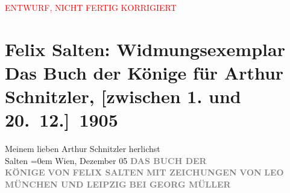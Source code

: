 
\begin{center}
            \textcolor{red}{ENTWURF, NICHT FERTIG KORRIGIERT}
                      \end{center}
            
         
         \renewcommand{\erwaehntePersonen}{Personen: Leo Kober}
         \renewcommand{\erwaehnteInstitutionen}{Institutionen: Georg Müller Verlag}
         \renewcommand{\erwaehnteOrte}{Orte: Leipzig, München, Wien}
         \renewcommand{\erwaehnteWerke}{Werke: Das Buch der Könige}
               \section[Felix Salten: Widmungsexemplar Das Buch der Könige für Arthur Schnitzler, {[}zwischen 1. und 20. 12.{]} 1905]{ Felix Salten: Widmungsexemplar Das Buch der Könige für Arthur
               Schnitzler, {[}zwischen 1. und 20. 12.{]} 1905}\nopagebreak{}\rehead{ }\begin{ledgroupsized}[t]{13cm}\normalsize\beginnumbering \toendnotes[C]{\smallbreak\pagebreak[2]} 
\pstart
           \noindent{}\centering{}{\pb}Meinem lieben Arthur Schnitzler\pend
           \pstart
           herlichst{\\[\baselineskip]}\spacefill\mbox{Salten}\pend
           \leftskip=0em{}\pstart
           Wien, Dezember 05\pend
           {\bigskip}\pstart
           \noindent{}\centering{}\textcolor{gray}{\textbf{DAS BUCH DER {\\}KÖNIGE}}\pend
           \pstart
           \noindent{}\centering{}\textcolor{gray}{\textbf{VON}}\pend
           \pstart
           \noindent{}\centering{}\textcolor{gray}{\textbf{FELIX SALTEN}}\pend
           {\bigskip}\pstart
           \noindent{}\centering{}\textcolor{gray}{\textbf{MIT ZEICHUNGEN}}\pend
           \pstart
           \noindent{}\centering{}\textcolor{gray}{\textbf{VON}}\pend
           \pstart
           \noindent{}\centering{}\textcolor{gray}{\textbf{LEO }}\pend
           {\bigskip}\pstart
           \noindent{}\centering{}\textcolor{gray}{\textbf{MÜNCHEN UND LEIPZIG}}\pend
           \pstart
           \noindent{}\centering{}\textcolor{gray}{\textbf{BEI GEORG MÜLLER}}\pend
           

\end{ledgroupsized}
